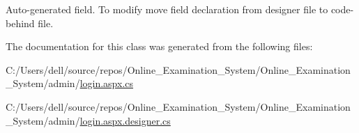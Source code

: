 Auto-\/generated field. To modify move field declaration from designer file to code-\/behind file. 

The documentation for this class was generated from the following files\+:\begin{DoxyCompactItemize}
\item 
C\+:/\+Users/dell/source/repos/\+Online\+\_\+\+Examination\+\_\+\+System/\+Online\+\_\+\+Examination\+\_\+\+System/admin/\mbox{\hyperlink{admin_2login_8aspx_8cs}{login.\+aspx.\+cs}}\item 
C\+:/\+Users/dell/source/repos/\+Online\+\_\+\+Examination\+\_\+\+System/\+Online\+\_\+\+Examination\+\_\+\+System/admin/\mbox{\hyperlink{admin_2login_8aspx_8designer_8cs}{login.\+aspx.\+designer.\+cs}}\end{DoxyCompactItemize}
